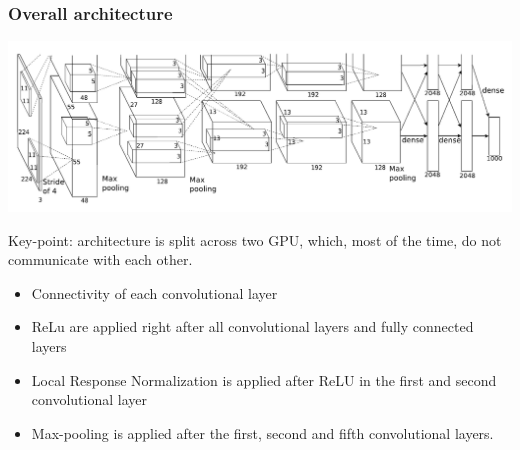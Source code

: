 \begin{frame}
	\frametitle{Overall architecture}
	
	
	
	\begin{center}
		\includegraphics[scale=0.6]{figs/AlexNet_twoGPU_architecture}
	\end{center}
	
	Key-point: architecture is split across two GPU, which, most of the time, do not communicate with each other.
	
	\begin{itemize}
		\item Connectivity of each convolutional layer
		\item ReLu are applied right after all convolutional layers and fully connected layers
		\item Local Response Normalization is applied after ReLU in the first and second convolutional layer
		\item Max-pooling is applied after the first, second and fifth convolutional layers.
	\end{itemize}
	
	
	
\end{frame}

